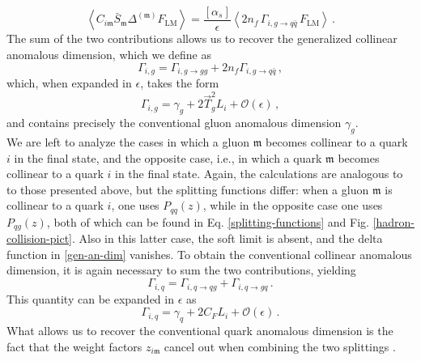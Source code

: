 \documentclass[a4paper, 12pt]{book}
\newcommand{\um}{\mathfrak{m}}
\begin{document}
\begin{equation}
  \left<  C_{i\um} \bar{S}_{\um} \Delta^{(\um)} F_{\mathrm{LM}}\right> = \frac{[\alpha_s]}{\epsilon} \left< 2n_f \, \Gamma_{i,g \to q \bar{q}} \, F_{\mathrm{LM}}\right> \, .
\end{equation}
The sum of the two contributions allows us to recover the generalized collinear anomalous dimension, which we define as
\begin{equation}
  \Gamma_{i,g} = \Gamma_{i,g \to gg} + 2n_f \Gamma_{i,g \to q \bar{q}} \, ,
  \label{an-dim-gluon}
\end{equation}
which, when expanded in $\epsilon$, takes the form 
\begin{equation}
  \Gamma_{i,g}=\gamma_g + 2 \vec{T}_g^2 L_i + \mathcal{O}(\epsilon) \, ,
  \label{expansion-an-dim-gluon}
\end{equation}
and contains precisely the conventional gluon anomalous dimension $\gamma_g$. \\

We are left to analyze the cases in which a gluon $\um$ becomes collinear to a quark $i$ in the final state, and the opposite case, i.e., in which a quark $\um$ becomes collinear to a quark $i$ in the final state. Again, the calculations are analogous to to those presented above, but the splitting functions differ: when a gluon $\um$ is collinear to a quark $i$, one uses $P_{qq}(z)$, while in the opposite case one uses $P_{qg}(z)$, both of which can be found in Eq. \ref{splitting-functions} and Fig. \ref{hadron-collision-pict}. Also in this latter case, the soft limit is absent, and the delta function in \ref{gen-an-dim} vanishes. To obtain the conventional collinear anomalous dimension, it is again necessary to sum the two contributions, yielding
\begin{equation}
  \Gamma_{i,q} = \Gamma_{i,q \to qg} + \Gamma_{i,q \to gq} \,.
  \label{an-dim-quark}
\end{equation}
This quantity can be expanded  in $\epsilon$ as 
\begin{equation}
  \Gamma_{i,q} = \gamma_q+ 2 C_F L_i + \mathcal{O}(\epsilon) \,. 
  \label{expansion-an-dim-quark}
\end{equation}
What allows us to recover the conventional quark anomalous dimension is the fact that the weight factors $z_{i\um}$ cancel out when combining the two splittings \cite{Devoto:2025kin}. 
\end{document}
